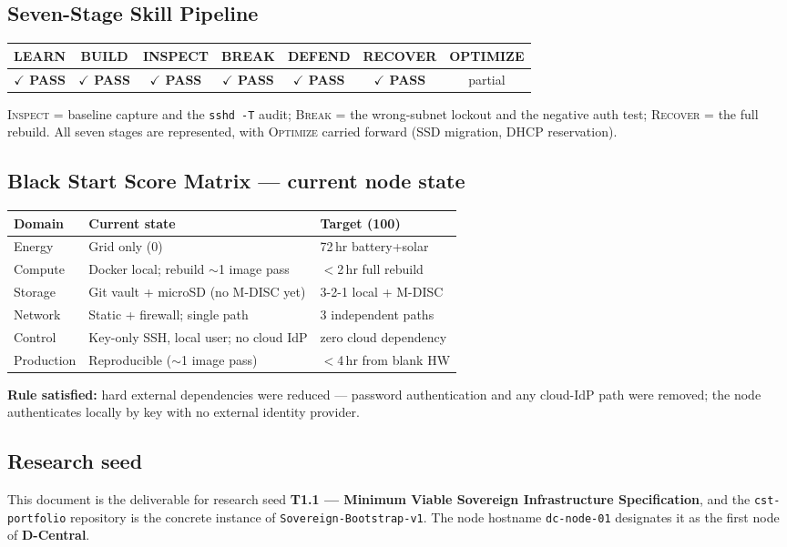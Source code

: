 \documentclass[11pt,a4paper]{article}
\newcommand{\pass}{\textcolor{okgreen}{\textbf{$\checkmark$ PASS}}}
\begin{document}
\subsection{Seven-Stage Skill Pipeline}
\begin{center}\small
\begin{tabular}{@{}c c c c c c c@{}}
\toprule
LEARN & BUILD & INSPECT & BREAK & DEFEND & RECOVER & OPTIMIZE\\
\midrule
\pass & \pass & \pass & \pass & \pass & \pass & partial\\
\bottomrule
\end{tabular}
\end{center}
\noindent \textsc{Inspect} = baseline capture and the \texttt{sshd -T} audit;
\textsc{Break} = the wrong-subnet lockout and the negative auth test;
\textsc{Recover} = the full rebuild. All seven stages are represented, with
\textsc{Optimize} carried forward (SSD migration, DHCP reservation).

\subsection{Black Start Score Matrix — current node state}
\begin{longtable}{@{}p{2.2cm} p{5.4cm} p{4.2cm}@{}}
\toprule
\textbf{Domain} & \textbf{Current state} & \textbf{Target (100)}\\
\midrule\endhead
Energy     & Grid only (0)                          & 72\,hr battery+solar\\
Compute    & Docker local; rebuild $\sim$1 image pass & $<$2\,hr full rebuild\\
Storage    & Git vault + microSD (no M-DISC yet)     & 3-2-1 local + M-DISC\\
Network    & Static + firewall; single path          & 3 independent paths\\
Control    & Key-only SSH, local user; no cloud IdP  & zero cloud dependency\\
Production & Reproducible ($\sim$1 image pass)        & $<$4\,hr from blank HW\\
\bottomrule
\end{longtable}
\noindent \textbf{Rule satisfied:} hard external dependencies were reduced —
password authentication and any cloud-IdP path were removed; the node authenticates
locally by key with no external identity provider.

\subsection{Research seed}
This document is the deliverable for research seed \textbf{T1.1 — Minimum Viable
Sovereign Infrastructure Specification}, and the \texttt{cst-portfolio} repository
is the concrete instance of \texttt{Sovereign-Bootstrap-v1}. The node hostname
\texttt{dc-node-01} designates it as the first node of \textbf{D-Central}.
\end{document}
